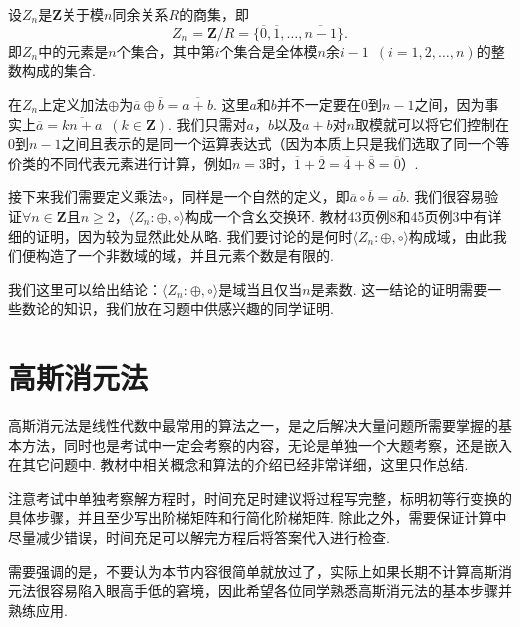 \begin{example}\label{ex:1:有限域}
    设$Z_n$是$\mathbf{Z}$关于模$n$同余关系$R$的商集，即
    \[Z_n=\mathbf{Z}/R=\{\overline{0},\overline{1},\ldots,\overline{n-1}\}.\]
    即$Z_n$中的元素是$n$个集合，其中第$i$个集合是全体模$n$余$i-1\enspace(i=1,2,\ldots,n)$的整数构成的集合.

    在$Z_n$上定义加法$\oplus$为$\overline{a}\oplus\overline{b}=\overline{a+b}$. 这里$a$和$b$并不一定要在$0$到$n-1$之间，因为事实上$\overline{a}=\overline{kn+a}\enspace(k\in\mathbf{Z})$. 我们只需对$a$，$b$以及$a+b$对$n$取模就可以将它们控制在$0$到$n-1$之间且表示的是同一个运算表达式（因为本质上只是我们选取了同一个等价类的不同代表元素进行计算，例如$n=3$时，$\overline{1}+\overline{2}=\overline{4}+\overline{8}=\overline{0}$）.

    接下来我们需要定义乘法$\circ$，同样是一个自然的定义，即$\overline{a}\circ\overline{b}=\overline{ab}$. 我们很容易验证$\forall n\in\mathbf{Z}$且$n\geqslant 2$，$\langle Z_n:\oplus,\circ\rangle$构成一个含幺交换环. 教材43页例8和45页例3中有详细的证明，因为较为显然此处从略. 我们要讨论的是何时$\langle Z_n:\oplus,\circ\rangle$构成域，由此我们便构造了一个非数域的域，并且元素个数是有限的.

    我们这里可以给出结论：$\langle Z_n:\oplus,\circ\rangle$是域当且仅当$n$是素数. 这一结论的证明需要一些数论的知识，我们放在习题中供感兴趣的同学证明.
\end{example}

\section{高斯消元法}

高斯消元法是线性代数中最常用的算法之一，是之后解决大量问题所需要掌握的基本方法，同时也是考试中一定会考察的内容，无论是单独一个大题考察，还是嵌入在其它问题中. 教材中相关概念和算法的介绍已经非常详细，这里只作总结.

注意考试中单独考察解方程时，时间充足时建议将过程写完整，标明初等行变换的具体步骤，并且至少写出阶梯矩阵和行简化阶梯矩阵. 除此之外，需要保证计算中尽量减少错误，时间充足可以解完方程后将答案代入进行检查.

需要强调的是，不要认为本节内容很简单就放过了，实际上如果长期不计算高斯消元法很容易陷入眼高手低的窘境，因此希望各位同学熟悉高斯消元法的基本步骤并熟练应用.

